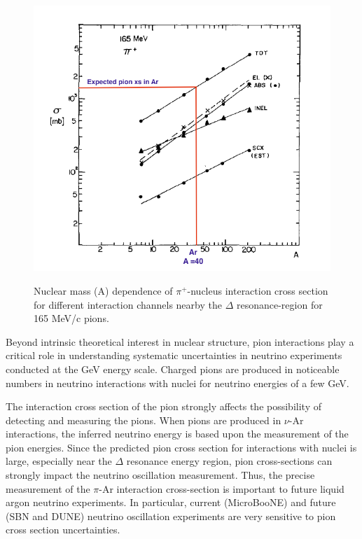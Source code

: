  
\begin{figure}[ht!]
\centering
\includegraphics[scale=0.45]{./images/pionXS_vs_A.png}\\
\caption{Nuclear mass (A) dependence of $\pi^{+}$-nucleus interaction cross section for different interaction channels nearby the $\Delta$ resonance-region for 165 MeV/c pions.\cite{ashery1}}
\label{fig:Adep}
\end{figure}

Beyond intrinsic theoretical interest in nuclear structure, pion interactions play a critical role in understanding systematic uncertainties in neutrino experiments conducted at the GeV energy scale. Charged pions are produced in noticeable numbers in neutrino interactions with nuclei for neutrino energies of a few GeV.  

The interaction cross section of the pion strongly affects the possibility of detecting and measuring the pions. When pions are produced in $\nu$-Ar interactions, the inferred neutrino energy is based upon the measurement of the pion energies. Since the predicted pion cross section for interactions with nuclei is large, especially near the $\Delta$ resonance energy region, pion cross-sections can strongly impact the neutrino oscillation measurement. Thus, the precise measurement of the $\pi$-Ar interaction cross-section is important to future liquid argon neutrino experiments. In particular, current (MicroBooNE) and future (SBN and DUNE) neutrino oscillation experiments are very sensitive to pion cross section uncertainties. 

